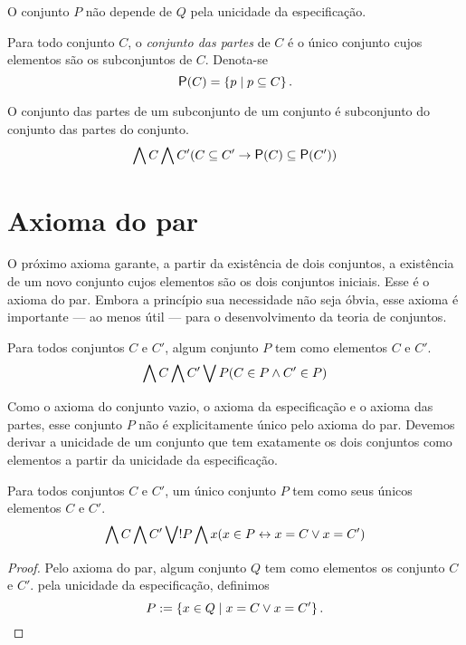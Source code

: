 O conjunto $P$ não depende de $Q$ pela unicidade da especificação.

\begin{definition}
Para todo conjunto $C$, o \emph{conjunto das partes} de $C$ é o único conjunto cujos elementos são os subconjuntos de $C$. Denota-se
	\begin{equation*}
	\p(C) = \set{p}{p \subseteq C}.
	\end{equation*}
\end{definition}

\begin{proposition}
O conjunto das partes de um subconjunto de um conjunto é subconjunto do conjunto das partes do conjunto.
	\begin{equation*}
	\forall C \forall C'(C \subseteq C' \limplica \p(C) \subseteq \p(C'))
	\end{equation*}
\end{proposition}

\section{Axioma do par}

O próximo axioma garante, a partir da existência de dois conjuntos, a existência de um novo conjunto cujos elementos são os dois conjuntos iniciais. Esse é o axioma do par. Embora a princípio sua necessidade não seja óbvia, esse axioma é importante --- ao menos útil --- para o desenvolvimento da teoria de conjuntos.

\begin{axiom}[Par]
Para todos conjuntos $C$ e $C'$, algum conjunto $P$ tem como elementos $C$ e $C'$.
	\begin{equation*}
	\bigwedge\nolimits C \bigwedge\nolimits C' \bigvee\nolimits P(C \in P \land C' \in P)
	\end{equation*}
\end{axiom}

Como o axioma do conjunto vazio, o axioma da especificação e o axioma das partes, esse conjunto $P$ não é explicitamente único pelo axioma do par. Devemos derivar a unicidade de um conjunto que tem exatamente os dois conjuntos como elementos a partir da unicidade da especificação.

\begin{proposition}
Para todos conjuntos $C$ e $C'$, um único conjunto $P$ tem como seus únicos elementos $C$ e $C'$.
	\begin{equation*}
	\bigwedge\nolimits C \bigwedge\nolimits C' \bigvee\nolimits ! P\bigwedge\nolimits x(x \in P \leftrightarrow x=C \lor x=C')
	\end{equation*}
\end{proposition}
\begin{proof}
Pelo axioma do par, algum conjunto $Q$ tem como elementos os conjunto $C$ e $C'$. pela unicidade da especificação, definimos
	\begin{equation*}
	P := \left\{{x \in Q}\;\middle\vert\;{x=C \lor x=C'}\right\}. \qedhere
	\end{equation*}
\end{proof}

